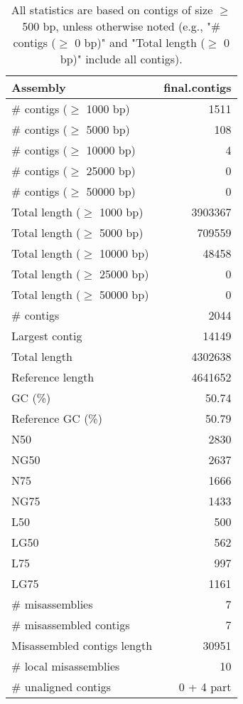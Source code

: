 \documentclass[12pt,a4paper]{article}
\begin{document}
\begin{table}[ht]
\begin{center}
\caption{All statistics are based on contigs of size $\geq$ 500 bp, unless otherwise noted (e.g., "\# contigs ($\geq$ 0 bp)" and "Total length ($\geq$ 0 bp)" include all contigs).}
\begin{tabular}{|l*{1}{|r}|}
\hline
Assembly & final.contigs \\ \hline
\# contigs ($\geq$ 1000 bp) & 1511 \\ \hline
\# contigs ($\geq$ 5000 bp) & 108 \\ \hline
\# contigs ($\geq$ 10000 bp) & 4 \\ \hline
\# contigs ($\geq$ 25000 bp) & 0 \\ \hline
\# contigs ($\geq$ 50000 bp) & 0 \\ \hline
Total length ($\geq$ 1000 bp) & 3903367 \\ \hline
Total length ($\geq$ 5000 bp) & 709559 \\ \hline
Total length ($\geq$ 10000 bp) & 48458 \\ \hline
Total length ($\geq$ 25000 bp) & 0 \\ \hline
Total length ($\geq$ 50000 bp) & 0 \\ \hline
\# contigs & 2044 \\ \hline
Largest contig & 14149 \\ \hline
Total length & 4302638 \\ \hline
Reference length & 4641652 \\ \hline
GC (\%) & 50.74 \\ \hline
Reference GC (\%) & 50.79 \\ \hline
N50 & 2830 \\ \hline
NG50 & 2637 \\ \hline
N75 & 1666 \\ \hline
NG75 & 1433 \\ \hline
L50 & 500 \\ \hline
LG50 & 562 \\ \hline
L75 & 997 \\ \hline
LG75 & 1161 \\ \hline
\# misassemblies & 7 \\ \hline
\# misassembled contigs & 7 \\ \hline
Misassembled contigs length & 30951 \\ \hline
\# local misassemblies & 10 \\ \hline
\# unaligned contigs & 0 + 4 part \\ \hline

\end{tabular}
\end{center}
\end{table}
\end{document}

